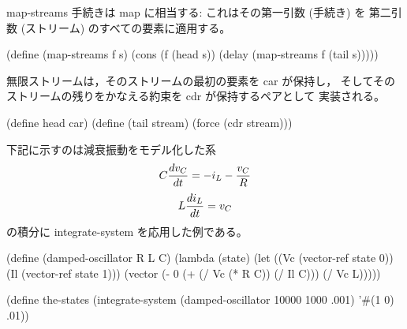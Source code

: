 {\cf map-streams} 手続きは {\cf map} に相当する: これはその第一引数 (手続き) を
第二引数 (ストリーム) のすべての要素に適用する。

\begin{schemenoindent}
(define (map-streams f s)
  (cons (f (head s))
        (delay (map-streams f (tail s)))))%
\end{schemenoindent}

無限ストリームは，そのストリームの最初の要素を car が保持し，
そしてそのストリームの残りをかなえる約束を cdr が保持するペアとして
実装される。

\begin{schemenoindent}
(define head car)
(define (tail stream)
  (force (cdr stream)))%
\end{schemenoindent}

\bigskip
下記に示すのは減衰振動をモデル化した系
$$ C {dv_C \over dt} = -i_L - {v_C \over R}$$\nobreak
$$ L {di_L \over dt} = v_C$$
の積分に {\cf integrate-system} を応用した例である。

\begin{schemenoindent}
(define (damped-oscillator R L C)
  (lambda (state)
    (let ((Vc (vector-ref state 0))
          (Il (vector-ref state 1)))
      (vector (- 0 (+ (/ Vc (* R C)) (/ Il C)))
              (/ Vc L)))))

(define the-states
  (integrate-system
     (damped-oscillator 10000 1000 .001)
     '\#(1 0)
     .01))%
\end{schemenoindent}

